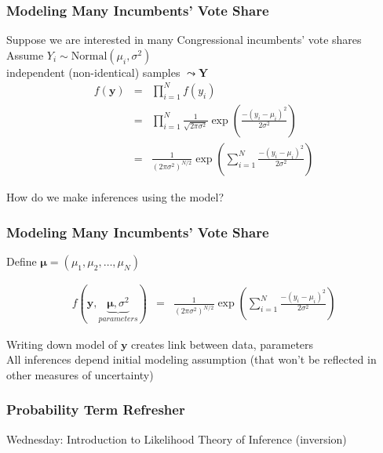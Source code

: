 \documentclass{beamer}
\begin{document}
\begin{frame}
\frametitle{Modeling Many Incumbents' Vote Share}


Suppose we are interested in many Congressional incumbents' vote shares\\
Assume $Y_{i} \sim \text{Normal}(\mu_{i}, \sigma^2)$\\
independent (non-identical) samples $\leadsto \boldsymbol{Y} $\\

\begin{eqnarray}
f(\boldsymbol{y} ) & = & \prod_{i=1}^{N} f(y_{i} ) \nonumber\\
					& = & \prod_{i=1}^{N}\frac{1}{\sqrt{2 \pi \sigma^2}  } \exp\left( \frac{ - (y_{i} - \mu_{i} )^ 2 }{2\sigma^2}\right)\nonumber \\
					& = & \frac{1}{ \left( 2 \pi \sigma^2  \right)^{N/2}} \exp \left(\sum_{i=1}^{N} \frac{- (y_i - \mu_{i} )^2}{2\sigma^2}   \right) \nonumber
\end{eqnarray}


How do we make inferences using the model?

\end{frame}

\begin{frame}
\frametitle{Modeling Many Incumbents' Vote Share}

Define $\boldsymbol{\mu} = (\mu_{1}, \mu_{2}, \hdots, \mu_{N})$


\begin{eqnarray}
f(\boldsymbol{y}, \underbrace{\boldsymbol{\mu}, \sigma^2}_{parameters}) & = & \frac{1}{ \left( 2 \pi \sigma^2  \right)^{N/2}} \exp \left(\sum_{i=1}^{N} \frac{- (y_i - \mu_{i} )^2}{2\sigma^2}   \right) \nonumber
\end{eqnarray}

Writing down model of $\boldsymbol{y}$ creates link between data, parameters\\
All inferences depend \alert{initial modeling assumption} (that won't be reflected in other measures of uncertainty)

\end{frame}


\begin{frame}
\frametitle{Probability Term Refresher}

\pause
\begin{itemize}
 \pause
{} \pause
{} \pause
{} \pause
{}
\end{itemize}



\end{frame}


\begin{frame}
Wednesday: Introduction to Likelihood Theory of Inference (inversion)\\



\end{frame}
\end{document}
